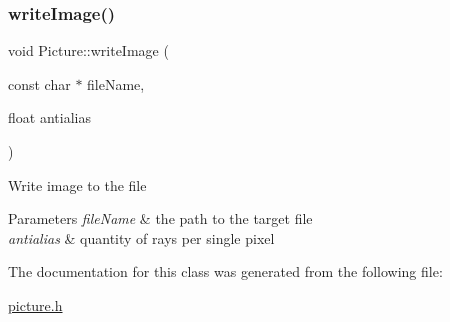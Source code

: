 \subsubsection{\texorpdfstring{write\+Image()}{writeImage()}}
{\footnotesize\ttfamily void Picture\+::write\+Image (\begin{DoxyParamCaption}\item[{const char $\ast$}]{file\+Name,  }\item[{float}]{antialias }\end{DoxyParamCaption})\hspace{0.3cm}{\ttfamily [inline]}}

Write image to the file 
\begin{DoxyParams}{Parameters}
{\em file\+Name} & the path to the target file \\
\hline
{\em antialias} & quantity of rays per single pixel \\
\hline
\end{DoxyParams}


The documentation for this class was generated from the following file\+:\begin{DoxyCompactItemize}
\item 
\mbox{\hyperlink{picture_8h}{picture.\+h}}\end{DoxyCompactItemize}

